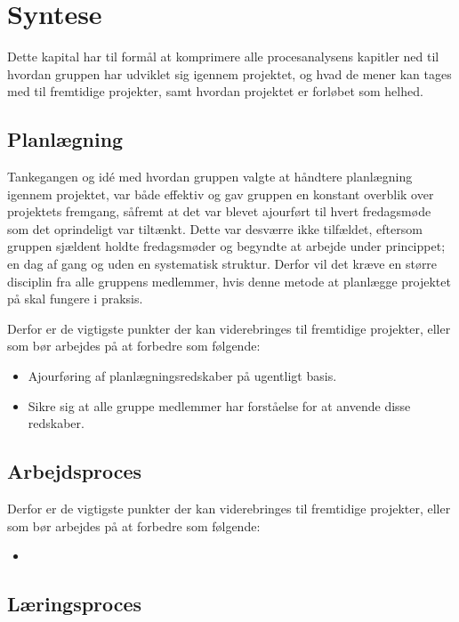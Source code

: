 \chapter{Syntese}

Dette kapital har til formål at komprimere alle procesanalysens kapitler ned til hvordan gruppen har udviklet sig igennem projektet, og hvad de mener kan tages med til fremtidige projekter, samt hvordan projektet er forløbet som helhed.

\section{Planlægning}
Tankegangen og idé med hvordan gruppen valgte at håndtere planlægning igennem projektet, var både effektiv og gav gruppen en konstant overblik over projektets fremgang, såfremt at det var blevet ajourført til hvert fredagsmøde som det oprindeligt var tiltænkt. Dette var desværre ikke tilfældet, eftersom gruppen sjældent holdte fredagsmøder og begyndte at arbejde under princippet; en dag af gang og uden en systematisk struktur. Derfor vil det kræve en større disciplin fra alle gruppens medlemmer, hvis denne metode at planlægge projektet på skal fungere i praksis.

Derfor er de vigtigste punkter der kan viderebringes til fremtidige projekter, eller som bør arbejdes på at forbedre som følgende:

\begin{itemize}
\item Ajourføring af planlægningsredskaber på ugentligt basis.
\item Sikre sig at alle gruppe medlemmer har forståelse for at anvende disse redskaber.
\end{itemize}

\section{Arbejdsproces}

Derfor er de vigtigste punkter der kan viderebringes til fremtidige projekter, eller som bør arbejdes på at forbedre som følgende:

\begin{itemize}
\item
\end{itemize}

\section{Læringsproces}

